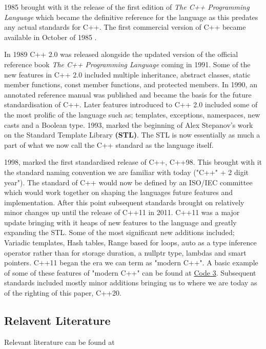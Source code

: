 \documentclass[conference, a4paper]{IEEEtran}
\begin{document}
1985 brought with it the release of the first edition of \textit{The C++ Programming Language} \cite{cpp_1985} which became the definitive reference for the language as this predates any actual standards for C++. The first commercial version of C++ became available in October of 1985 \cite{cppinvention}.

In 1989 C++ 2.0 was released alongside the updated version of the official reference book \textit{The C++ Programming Language} coming in 1991. Some of the new features in C++ 2.0 included multiple inheritance, abstract classes, static member functions, const member functions, and protected members. In 1990, an annotated reference manual was published and became the basis for the future standardisation of C++. Later features introduced to C++ 2.0 included some of the most prolific of the language such as; templates, exceptions, namespaces, new casts and a Boolean type. 1993, marked the beginning of Alex Stepanov's work on the Standard Template Library \textbf{(STL)}. The STL is now essentially as much a part of what we now call the C++ standard as the language itself. 

1998, marked the first standardised release of C++, C++98. This brought with it the standard naming convention we are familiar with today ("C++" + 2 digit year"). The standard of C++ would now be defined by an ISO/IEC committee which would work together on shaping the languages future features and implementation. After this point subsequent standards brought on relatively minor changes up until the release of C++11 in 2011. C++11 was a major update bringing with it heaps of new features to the language and greatly expanding the STL. Some of the most significant new additions included; Variadic templates, Hash tables, Range based for loops, auto as a type inference operator rather than for storage duration, a nullptr type, lambdas and smart pointers. C++11 began the era we can term as "modern C++". A basic example of some of these features of "modern C++" can be found at \hyperref[listing:3]{Code 3}. Subsequent standards included mostly minor additions bringing us to where we are today as of the righting of this paper, C++20.


\subsection{Relavent Literature}
Relevant literature can be found at \cite{cpphome,cpp_1985,cpphistory,cppoverview,cppevolving,josuttis2012c++,alexandrescu2001modern}
\end{document}
